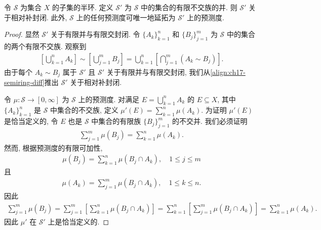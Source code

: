 \documentclass[../../main.tex]{subfiles}
\begin{document}
\begin{proposition}\label{proposition:ch17-semiring-extension}
令 $\mathcal{S}$ 为集合 $X$ 的子集的半环. 定义 $\mathcal{S}'$ 为 $\mathcal{S}$ 中的集合的有限不交族的并. 则 $\mathcal{S}'$ 关于相对补封闭. 此外, $\mathcal{S}$ 上的任何预测度可唯一地延拓为 $\mathcal{S}'$ 上的预测度.
\end{proposition}

\begin{proof}
显然 $\mathcal{S}'$ 关于有限并与有限交封闭. 令 $\{A_{k}\}_{k=1}^{n}$ 和 $\{B_{j}\}_{j=1}^{m}$ 为 $\mathcal{S}$ 中的集合的两个有限不交族. 观察到
\begin{align}
\left[\bigcup_{k=1}^{n}A_{k}\right]\sim\left[\bigcup_{j=1}^{m}B_{j}\right]=\bigcup_{k=1}^{n}\left[\bigcap_{j=1}^{m}(A_{k}\sim B_{j})\right].\label{align:ch17-semiring-diff}
\end{align}
由于每个 $A_{k}\sim B_{j}$ 属于 $\mathcal{S}'$ 且 $\mathcal{S}'$ 关于有限并与有限交封闭, 我们从\eqref{align:ch17-semiring-diff}推出 $\mathcal{S}'$ 关于相对补封闭.

令 $\mu:\mathcal{S}\to[0,\infty]$ 为 $\mathcal{S}$ 上的预测度. 对满足 $E=\bigcup_{k=1}^{n}A_{k}$ 的 $E\subseteq X$, 其中 $\{A_{k}\}_{k=1}^{n}$ 是 $\mathcal{S}$ 中集合的不交族, 定义 $\mu'(E)=\sum_{k=1}^{n}\mu(A_{k})$. 为证明 $\mu'(E)$ 是恰当定义的, 令 $E$ 也是 $\mathcal{S}$ 中集合的有限族 $\{B_{j}\}_{j=1}^{m}$ 的不交并. 我们必须证明
\begin{align*}
\sum_{j=1}^{m}\mu(B_{j})=\sum_{k=1}^{n}\mu(A_{k}).
\end{align*}
然而, 根据预测度的有限可加性,
\begin{align*}
\mu(B_{j})=\sum_{k=1}^{n}\mu(B_{j}\cap A_{k}),\quad 1\leqslant j\leqslant m
\end{align*}
且
\begin{align*}
\mu(A_{k})=\sum_{j=1}^{m}\mu(B_{j}\cap A_{k}),\quad 1\leqslant k\leqslant n.
\end{align*}
因此
\begin{align*}
\sum_{j=1}^{m}\mu(B_{j})=\sum_{j=1}^{m}\left[\sum_{k=1}^{n}\mu(B_{j}\cap A_{k})\right]=\sum_{k=1}^{n}\left[\sum_{j=1}^{m}\mu(B_{j}\cap A_{k})\right]=\sum_{k=1}^{n}\mu(A_{k}).
\end{align*}
因此 $\mu'$ 在 $\mathcal{S}'$ 上是恰当定义的.


\end{proof}
\end{document}
